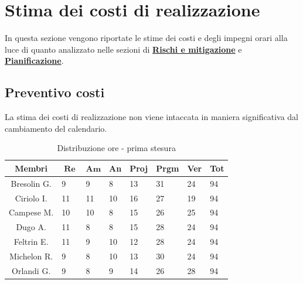 \documentclass[10pt, a4paper]{article}
\begin{document}
{{{{{{


\section{Stima dei costi di realizzazione}
In questa sezione vengono riportate le stime dei costi e degli impegni orari alla luce di quanto analizzato nelle sezioni di \hyperref[section:Rischi]{\textbf{Rischi e mitigazione}} e \hyperref[section:Pianificazione]{\textbf{Pianificazione}}.

\subsection{Preventivo costi}
La stima dei costi di realizzazione non viene intaccata in maniera significativa dal cambiamento del calendario.

{\renewcommand{\arraystretch}{1.2}
\begin{table}[H]
\begin{tabularx}{\textwidth}{c|X|X|X|X|X|X|X}
        \textbf{Membri} & $\operatorname{\textbf{Re}}$ & $\mathrm{\textbf{Am}}$ & \textbf{An} & \textbf{Proj} & \textbf{Prgm} & \textbf{Ver} & \textbf{Tot} \\
        \hline Bresolin G. & 9 & 9 & 8 & 13 & 31 & 24 & 94 \\
        \hline Ciriolo I. & 11 & 11 & 10 & 16 & 27 & 19 & 94 \\
        \hline Campese M. & 10 & 10 & 8 & 15 & 26 & 25 & 94 \\
        \hline Dugo A. & 11 & 8 & 8 & 15 & 28 & 24 & 94 \\
        \hline Feltrin E. & 11 & 9 & 10 & 12 & 28 & 24 & 94 \\
        \hline Michelon R. & 9 & 8 & 10 & 13 & 30 & 24 & 94 \\
        \hline Orlandi G. & 9 & 8 & 9 & 14 & 26 & 28 & 94 
    \end{tabularx}
    \caption{Distribuzione ore - prima stesura}
    \end{table}

}}}}}}}
\end{document}
